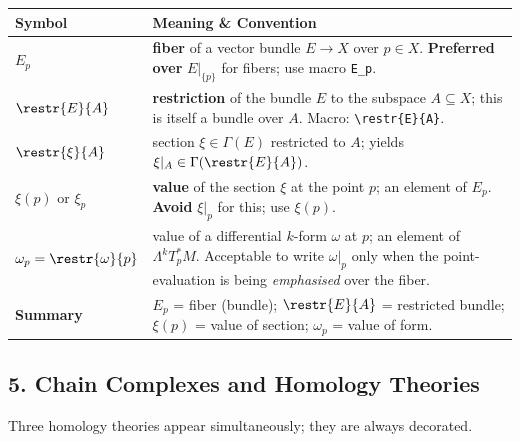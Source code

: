 \begin{longtable}{@{} p{4.5cm} p{9.5cm} @{}}
	\toprule
	\textbf{Symbol} & \textbf{Meaning \& Convention} \\
	\midrule
	\endhead
	
	$E_p$
	& \textbf{fiber} of a vector bundle $E\to X$ over $p\in X$.
	\textbf{Preferred over} $E|_{\{p\}}$ for fibers;
	use macro \texttt{E\_p}. \\[4pt]
	
	$\restr{E}{A}$
	& \textbf{restriction} of the bundle $E$ to the subspace
	$A\subseteq X$; this is itself a bundle over $A$.
	Macro: \texttt{\textbackslash restr\{E\}\{A\}}.\\[4pt]
	
	$\restr{\xi}{A}$
	& section $\xi\in\Gamma(E)$ restricted to $A$;
	yields $\xi|_A\in\Gamma(\restr{E}{A})$. \\[4pt]
	
	$\xi(p)$ or $\xi_p$
	& \textbf{value} of the section $\xi$ at the point $p$;
	an element of $E_p$. \textbf{Avoid} $\xi|_p$ for this; use $\xi(p)$.\\[4pt]
	
	$\omega_p = \restr{\omega}{p}$
	& value of a differential $k$-form $\omega$ at $p$;
	an element of $\Lambda^k T^*_p M$.
	Acceptable to write $\omega|_p$ only when
	the point-evaluation is being \emph{emphasised} over the fiber. \\[4pt]
	
	\textbf{Summary}
	& $E_p$ = fiber (bundle); \quad
	$\restr{E}{A}$ = restricted bundle; \quad
	$\xi(p)$ = value of section; \quad
	$\omega_p$ = value of form. \\[4pt]
	
	\bottomrule
\end{longtable}


\subsection*{5. Chain Complexes and Homology Theories}

\medskip\noindent
Three homology theories appear simultaneously; they are always decorated.

